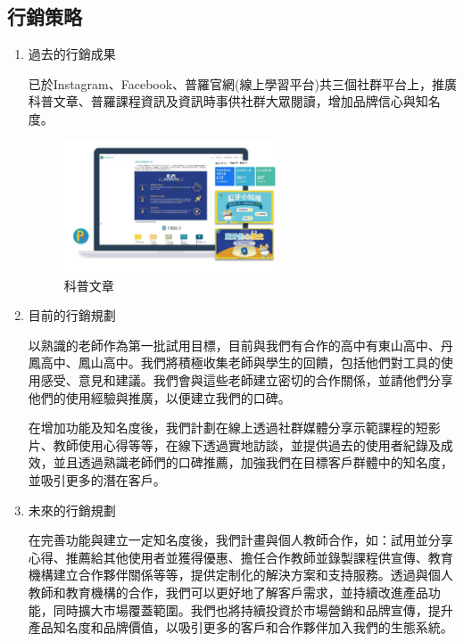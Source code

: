 \subsection{行銷策略}

\begin{enumerate}[label=(\arabic*)]
  \setlength{\parindent}{2em}
  \item 過去的行銷成果
    \par 已於Instagram、Facebook、普羅官網(線上學習平台)共三個社群平台上，推廣科普文章、普羅課程資訊及資訊時事供社群大眾閱讀，增加品牌信心與知名度。
    \begin{figure}[H]
      \centering
      \includegraphics[width=0.6\textwidth]{./Strategies/img/article.png}
      \caption[科普文章]{科普文章}
  	\end{figure}
  \item 目前的行銷規劃
  	\par 以熟識的老師作為第一批試用目標，目前與我們有合作的高中有東山高中、丹鳳高中、鳳山高中。我們將積極收集老師與學生的回饋，包括他們對工具的使用感受、意見和建議。我們會與這些老師建立密切的合作關係，並請他們分享他們的使用經驗與推廣，以便建立我們的口碑。
  	\par 在增加功能及知名度後，我們計劃在線上透過社群媒體分享示範課程的短影片、教師使用心得等等，在線下透過實地訪談，並提供過去的使用者紀錄及成效，並且透過熟識老師們的口碑推薦，加強我們在目標客戶群體中的知名度，並吸引更多的潛在客戶。
  \item 未來的行銷規劃
  	\par 在完善功能與建立一定知名度後，我們計畫與個人教師合作，如：試用並分享心得、推薦給其他使用者並獲得優惠、擔任合作教師並錄製課程供宣傳、教育機構建立合作夥伴關係等等，提供定制化的解決方案和支持服務。透過與個人教師和教育機構的合作，我們可以更好地了解客戶需求，並持續改進產品功能，同時擴大市場覆蓋範圍。我們也將持續投資於市場營銷和品牌宣傳，提升產品知名度和品牌價值，以吸引更多的客戶和合作夥伴加入我們的生態系統。
\end{enumerate}

